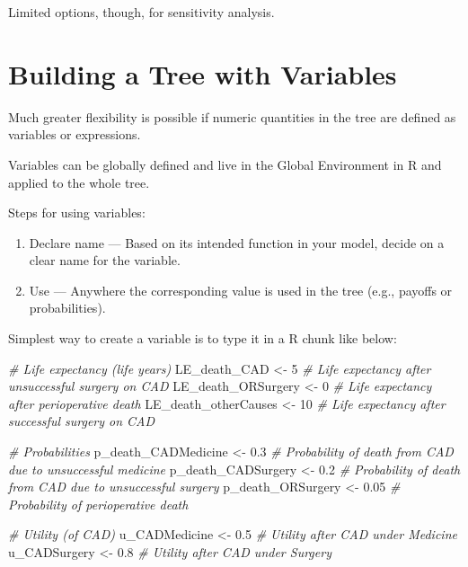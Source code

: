 \documentclass[
]{article}
\newenvironment{Shaded}{\begin{snugshade}}{\end{snugshade}}
\newcommand{\CommentTok}[1]{\textcolor[rgb]{0.56,0.35,0.01}{\textit{#1}}}
\newcommand{\DecValTok}[1]{\textcolor[rgb]{0.00,0.00,0.81}{#1}}
\newcommand{\FloatTok}[1]{\textcolor[rgb]{0.00,0.00,0.81}{#1}}
\newcommand{\NormalTok}[1]{#1}
\newcommand{\OtherTok}[1]{\textcolor[rgb]{0.56,0.35,0.01}{#1}}
\providecommand{\tightlist}{%
  \setlength{\itemsep}{0pt}\setlength{\parskip}{0pt}}
\begin{document}
Limited options, though, for sensitivity analysis.

\hypertarget{building-a-tree-with-variables}{%
\section{Building a Tree with
Variables}\label{building-a-tree-with-variables}}

Much greater flexibility is possible if numeric quantities in the tree
are defined as variables or expressions.

Variables can be globally defined and live in the Global Environment in
R and applied to the whole tree.

Steps for using variables:

\begin{enumerate}
\def\labelenumi{\arabic{enumi}.}
\tightlist
\item
  Declare name --- Based on its intended function in your model, decide
  on a clear name for the variable.
\item
  Use --- Anywhere the corresponding value is used in the tree (e.g.,
  payoffs or probabilities).
\end{enumerate}

Simplest way to create a variable is to type it in a R chunk like below:

\begin{Shaded}
\begin{Highlighting}[]
\CommentTok{\# Life expectancy (life years)}
\NormalTok{LE\_death\_CAD         }\OtherTok{\textless{}{-}} \DecValTok{5}    \CommentTok{\# Life expectancy after unsuccessful surgery on CAD}
\NormalTok{LE\_death\_ORSurgery   }\OtherTok{\textless{}{-}} \DecValTok{0}    \CommentTok{\# Life expectancy after perioperative death }
\NormalTok{LE\_death\_otherCauses }\OtherTok{\textless{}{-}} \DecValTok{10}   \CommentTok{\# Life expectancy after successful surgery on CAD }

\CommentTok{\# Probabilities}
\NormalTok{p\_death\_CADMedicine  }\OtherTok{\textless{}{-}} \FloatTok{0.3}  \CommentTok{\# Probability of death from CAD due to unsuccessful medicine}
\NormalTok{p\_death\_CADSurgery   }\OtherTok{\textless{}{-}} \FloatTok{0.2}  \CommentTok{\# Probability of death from CAD due to unsuccessful surgery}
\NormalTok{p\_death\_ORSurgery    }\OtherTok{\textless{}{-}} \FloatTok{0.05} \CommentTok{\# Probability of perioperative death}

\CommentTok{\# Utility (of CAD)}
\NormalTok{u\_CADMedicine        }\OtherTok{\textless{}{-}} \FloatTok{0.5}  \CommentTok{\# Utility after CAD under Medicine}
\NormalTok{u\_CADSurgery         }\OtherTok{\textless{}{-}} \FloatTok{0.8}  \CommentTok{\# Utility after CAD under Surgery}
\end{Highlighting}
\end{Shaded}
\end{document}
